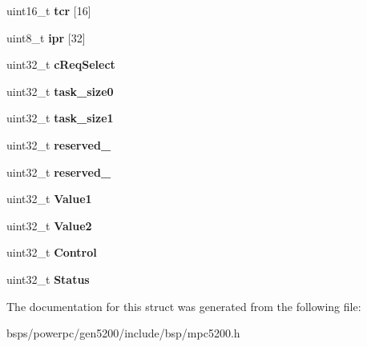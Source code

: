 \begin{DoxyCompactItemize}
\mbox{\label{structmpc5200__sdma_adbcaf77de93172e267ddd4e10388103b}} 
uint16\+\_\+t {\bfseries tcr} \mbox{[}16\mbox{]}
\item 
\mbox{\label{structmpc5200__sdma_a016bd6a478df5f456315d50760ae9605}} 
uint8\+\_\+t {\bfseries ipr} \mbox{[}32\mbox{]}
\item 
\mbox{\label{structmpc5200__sdma_a4f1a8997f1c096bf142f89a25a4fc898}} 
uint32\+\_\+t {\bfseries c\+Req\+Select}
\item 
\mbox{\label{structmpc5200__sdma_ae5a38b05be544f839d4334ea009e5d30}} 
uint32\+\_\+t {\bfseries task\+\_\+size0}
\item 
\mbox{\label{structmpc5200__sdma_a001a442b04430175cc19af5cd6bc8151}} 
uint32\+\_\+t {\bfseries task\+\_\+size1}
\item 
\mbox{\label{structmpc5200__sdma_ac9e2ede12c2aaafee543040d695c6150}} 
uint32\+\_\+t {\bfseries reserved\+\_}
\item 
\mbox{\label{structmpc5200__sdma_a97740f2b8b968a094ad37c9adcce91ea}} 
uint32\+\_\+t {\bfseries reserved\+\_}
\item 
\mbox{\label{structmpc5200__sdma_a6851e00d08971335db06ee3043c462d2}} 
uint32\+\_\+t {\bfseries Value1}
\item 
\mbox{\label{structmpc5200__sdma_a5d64229874727989160604c10abc3822}} 
uint32\+\_\+t {\bfseries Value2}
\item 
\mbox{\label{structmpc5200__sdma_a856a346e4401c4ab5c7850b63e2db032}} 
uint32\+\_\+t {\bfseries Control}
\item 
\mbox{\label{structmpc5200__sdma_a36418f7850d21126e3ea689baf4d41e7}} 
uint32\+\_\+t {\bfseries Status}
\end{DoxyCompactItemize}


The documentation for this struct was generated from the following file\+:\begin{DoxyCompactItemize}
\item 
bsps/powerpc/gen5200/include/bsp/mpc5200.\+h\end{DoxyCompactItemize}
